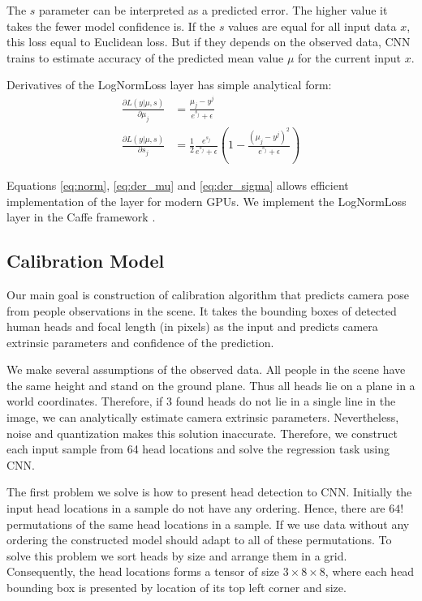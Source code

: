 The $s$ parameter can be interpreted as a predicted error. The higher value it takes the fewer model confidence is. If the $s$ values are equal for all input data $x$, this loss equal to Euclidean loss. But if they depends on the observed data, CNN trains to estimate accuracy of the predicted mean value $\mu$ for the current input $x$.

Derivatives of the LogNormLoss layer has simple analytical form:
\begin{align}
	\frac{\partial L(y | \mu, s)}{\partial \mu_j} &= 
	\frac{\mu_j - y^j}{e^{s_j} + \epsilon}
	\label{eq:der_mu} \\
	\frac{\partial L(y | \mu, s)}{\partial s_j} &= 
	\frac{1}{2}\frac{e^{s_j}}{e^{s_j} + \epsilon}
	\left(1 - \frac{(\mu_j - y^j) ^ 2}{e^{s_j} + \epsilon}\right)  \label{eq:der_sigma}
\end{align}

Equations \eqref{eq:norm}, \eqref{eq:der_mu} and \eqref{eq:der_sigma} allows efficient implementation of the layer for modern GPUs. We implement the LogNormLoss layer in the Caffe framework \cite{jia2014caffe}.

\subsection{Calibration Model}
\label{sec:calibration}

Our main goal is construction of calibration algorithm that predicts camera pose from people observations in the scene. It takes the bounding boxes of detected human heads and focal length (in pixels) as the input and predicts camera extrinsic parameters and confidence of the prediction.

We make several assumptions of the observed data. All people in the scene have the same height and stand on the ground plane. Thus all heads lie on a plane in a world coordinates. Therefore, if 3 found heads do not lie in a single line in the image, we can analytically estimate camera extrinsic parameters. Nevertheless, noise and quantization makes this solution inaccurate. Therefore, we construct each input sample from 64 head locations and solve the regression task using CNN.

The first problem we solve is how to present head detection to CNN. Initially the input head locations in a sample do not have any ordering. Hence, there are $64!$ permutations of the same head locations in a sample. If we use data without any ordering the constructed model should adapt to all of these permutations. To solve this problem we sort heads by size and arrange them in a grid. Consequently, the head locations forms a tensor of size $3\times8\times8$, where each head bounding box is presented by location of its top left corner and size.

